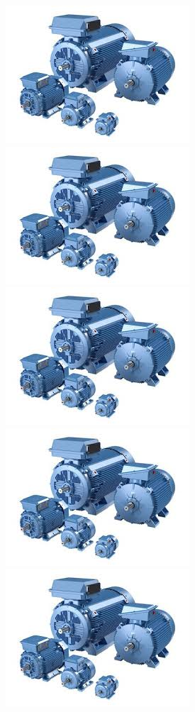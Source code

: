 \documentclass{beamer}
\begin{document}
\begin{frame}
\begin{figure}[H]
		\includegraphics[width=0.2\linewidth]{motor1}
		\includegraphics[width=0.2\linewidth]{motor1}
		\includegraphics[width=0.2\linewidth]{motor1}
		\includegraphics[width=0.2\linewidth]{motor1}
		\includegraphics[width=0.2\linewidth]{motor1}
	\end{figure}
\end{frame}
\end{document}
